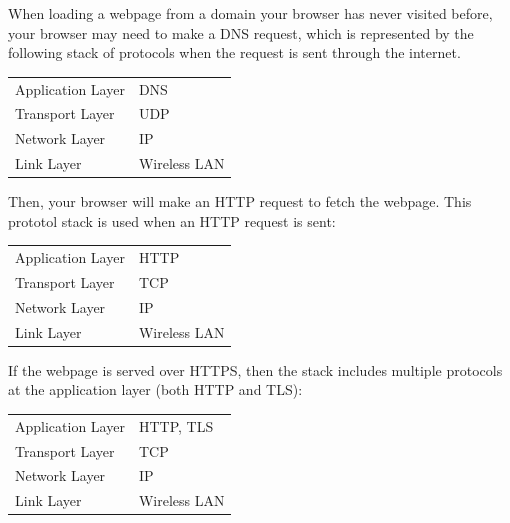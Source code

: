 \documentclass{article}
\newcounter{example}[section]
\begin{document}
  \begin{example}
    \label{ex:resolving-a-new-domain}
  When loading a webpage from a domain your browser has never visited before, your browser may need to make a DNS request, which is represented by the following stack of protocols when the request is sent through the internet. 
  \begin{center}
  \begin{tabular}{l|l}
      Application Layer & DNS\\
      Transport Layer & UDP \\
      Network Layer & IP \\
      Link Layer & Wireless LAN
  \end{tabular}
  \end{center}
  Then, your browser will make an HTTP request to fetch the webpage. This prototol stack is used when an HTTP request is sent:
  \begin{center}
  \begin{tabular}{l|l}
      Application Layer & HTTP\\
      Transport Layer & TCP \\
      Network Layer & IP \\
      Link Layer & Wireless LAN
  \end{tabular}
  \end{center}
  If the webpage is served over HTTPS, then the stack includes multiple protocols at the application layer (both HTTP and TLS): 
  \begin{center}
  \begin{tabular}{l|l}
      Application Layer & HTTP, TLS\\
      Transport Layer & TCP \\
      Network Layer & IP \\
      Link Layer & Wireless LAN
  \end{tabular}
  \end{center}
  \end{example}
\end{document}
